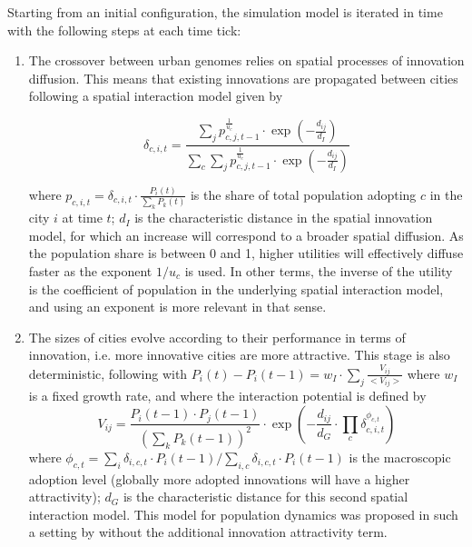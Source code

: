 \documentclass[letterpaper]{article}
\begin{document}
Starting from an initial configuration, the simulation model is iterated in time with the following steps at each time tick:


\begin{enumerate}
	\item The crossover between urban genomes relies on spatial processes of innovation diffusion. This means that existing innovations are propagated between cities following a spatial interaction model given by

\begin{equation}
\delta_{c,i,t} = \frac{\sum_j p_{c,j,t-1}^{\frac{1}{u_c}} \cdot \exp{(-\frac{d_{ij}}{d_I})}}{\sum_c \sum_j p_{c,j,t-1}^{\frac{1}{u_c}} \cdot \exp{(-\frac{d_{ij}}{d_I})}}
\end{equation}

where $p_{c,i,t} = \delta_{c,i,t} \cdot \frac{P_{i}(t)}{\sum_k P_k (t)}$ is the share of total population adopting $c$ in the city $i$ at time $t$; $d_I$ is the characteristic distance in the spatial innovation model, for which an increase will correspond to a broader spatial diffusion. As the population share is between 0 and 1, higher utilities will effectively diffuse faster as the exponent $1/u_c$ is used. In other terms, the inverse of the utility is the coefficient of population in the underlying spatial interaction model, and using an exponent is more relevant in that sense.


	\item The sizes of cities evolve according to their performance in terms of innovation, i.e. more innovative cities are more attractive. This stage is also deterministic, following  with $P_i(t) - P_i(t-1) = w_I\cdot \sum_j \frac{V_{ij}}{<V_{ij}>}$ where $w_I$ is a fixed growth rate, and where the interaction potential is defined by
\begin{equation}
V_{ij}= \frac{P_{i}(t-1) \cdot P_{j}(t-1)}{(\sum_k P_k(t-1))^2} \cdot \exp{\left(-\frac{d_{ij}}{d_G} \cdot \prod_c \delta_{c,i,t}^{\phi_{c,t}}\right)}
\end{equation}
where $\phi_{c,t} = \sum_i \delta_{i,c,t}\cdot P_i(t-1) /\sum_{i,c} \delta_{i,c,t}\cdot P_{i}(t-1)$ is the macroscopic adoption level (globally more adopted innovations will have a higher attractivity); $d_G$ is the characteristic distance for this second spatial interaction model. This model for population dynamics was proposed in such a setting by \citep{raimbault2020indirect} without the additional innovation attractivity term.


\end{enumerate}
\end{document}
